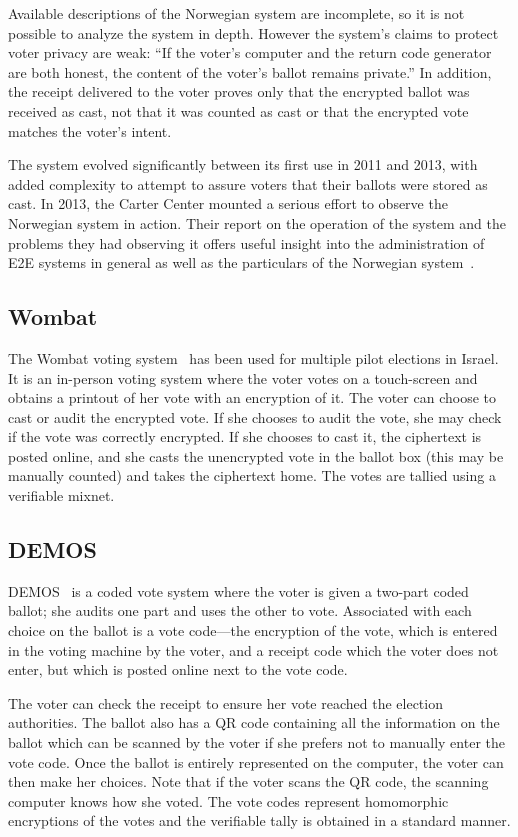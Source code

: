 Available descriptions of the Norwegian system are incomplete, so it
is not possible to analyze the system in depth. However the system's
claims to protect voter privacy are weak: ``If the voter's computer
and the return code generator are both honest, the content of the
voter's ballot remains private.'' In addition, the receipt delivered
to the voter proves only that the encrypted ballot was received as
cast, not that it was counted as cast or that the encrypted vote
matches the voter's intent.

The system evolved significantly between its first use in 2011 and
2013, with added complexity to attempt to assure voters that their
ballots were stored as cast. In 2013, the Carter Center mounted a
serious effort to observe the Norwegian system in action. Their
report on the operation of the system and the problems
they had observing it offers useful insight into the administration of
E2E systems in general as well as the particulars of the Norwegian
system~\cite{carter2013}.

\subsection{Wombat}

The Wombat voting system~\cite{rosen2011} has been used for multiple
pilot elections in Israel. It is an in-person voting system where the
voter votes on a touch-screen and obtains a printout of her vote with
an encryption of it. The voter can choose to cast or audit the
encrypted vote. If she chooses to audit the vote, she may check if the
vote was correctly encrypted. If she chooses to cast it, the
ciphertext is posted online, and she casts the unencrypted vote in the
ballot box (this may be manually counted) and takes the ciphertext
home. The votes are tallied using a verifiable mixnet.

\subsection{DEMOS}

DEMOS~\cite{kiayias2014} is a coded vote system where the voter is
given a two-part coded ballot; she audits one part and uses the other
to vote. Associated with each choice on the ballot is a vote
code---the encryption of the vote, which is entered in the voting
machine by the voter, and a receipt code which the voter does not
enter, but which is posted online next to the vote code.

The voter can check the receipt to ensure her vote reached the
election authorities. The ballot also has a QR code containing all the
information on the ballot which can be scanned by the voter if she
prefers not to manually enter the vote code. Once the ballot is
entirely represented on the computer, the voter can then make her
choices. Note that if the voter scans the QR code, the scanning
computer knows how she voted. The vote codes represent homomorphic
encryptions of the votes and the verifiable tally is obtained in a
standard manner.

